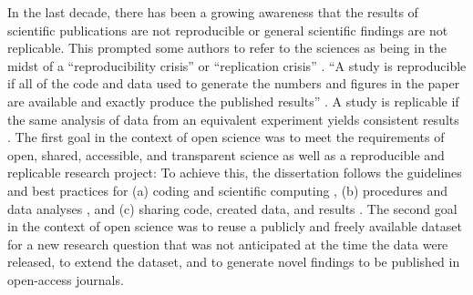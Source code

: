 In the last decade, there has been a growing awareness that the results of
scientific publications are not reproducible or general scientific findings are
not replicable.
%
This prompted some authors to refer to the sciences as being in the midst of a
``reproducibility crisis'' or ``replication crisis''
\citep{baker2016reproducibility, plesser2018reproducibility,
stupple2019reproducibility, nosek2022replicability}.
``A study is reproducible if all of the code and data used to generate the
numbers and figures in the paper are available and exactly produce the published
results'' \citep[][p. 111]{leek2017most}.
A study is replicable if the same analysis of data from an equivalent experiment
yields consistent results \citep{dubois2016building, leek2017most}.
%
The first goal in the context of open science was to meet the requirements of
open, shared, accessible, and transparent science \citep[cf.][]{watson2015will,
fecher2014open} as well as a reproducible and replicable research project:
%
To achieve this, the dissertation follows the guidelines and best practices for
(a) coding and scientific computing \citep{wilson2014best}, (b) procedures and
data analyses \citep{nichols2017best, poldrack2017scanning,
poldrack2019establishment}, and (c) sharing code, created data, and results
\citep{eglen2017toward, nichols2017best, pernet2015improving}.
The second goal in the context of open science was to reuse a publicly and
freely available dataset for a new research question that was not anticipated at
the time the data were released, to extend the dataset, and to generate novel
findings to be published in open-access journals.

